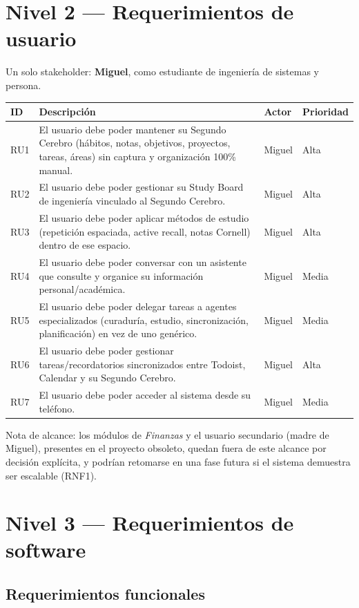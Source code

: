 \documentclass[11pt,a4paper]{article}
\begin{document}
\section{Nivel 2 --- Requerimientos de usuario}

Un solo stakeholder: \textbf{Miguel}, como estudiante de ingeniería de sistemas y persona.

\begin{longtable}{@{}p{1.3cm}p{9.7cm}p{1.8cm}p{1.6cm}@{}}
\toprule
ID & Descripción & Actor & Prioridad \\
\midrule
\endhead
RU1 & El usuario debe poder mantener su Segundo Cerebro (hábitos, notas, objetivos, proyectos, tareas, áreas) sin captura y organización 100\% manual. & Miguel & Alta \\
RU2 & El usuario debe poder gestionar su Study Board de ingeniería vinculado al Segundo Cerebro. & Miguel & Alta \\
RU3 & El usuario debe poder aplicar métodos de estudio (repetición espaciada, active recall, notas Cornell) dentro de ese espacio. & Miguel & Alta \\
RU4 & El usuario debe poder conversar con un asistente que consulte y organice su información personal/académica. & Miguel & Media \\
RU5 & El usuario debe poder delegar tareas a agentes especializados (curaduría, estudio, sincronización, planificación) en vez de uno genérico. & Miguel & Media \\
RU6 & El usuario debe poder gestionar tareas/recordatorios sincronizados entre Todoist, Calendar y su Segundo Cerebro. & Miguel & Alta \\
RU7 & El usuario debe poder acceder al sistema desde su teléfono. & Miguel & Media \\
\bottomrule
\end{longtable}

Nota de alcance: los módulos de \emph{Finanzas} y el usuario secundario (madre de Miguel), presentes en el proyecto obsoleto, quedan fuera de este alcance por decisión explícita, y podrían retomarse en una fase futura si el sistema demuestra ser escalable (RNF1).

\section{Nivel 3 --- Requerimientos de software}

\subsection{Requerimientos funcionales}
\end{document}
